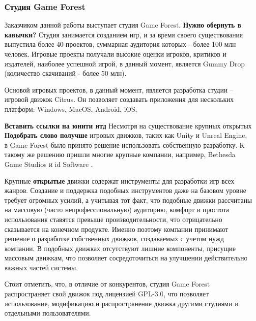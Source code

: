 \documentclass{fefu}
\begin{document}
			\subsubsection{Студия Game Forest}
				\par Заказчиком данной работы выступает студия Game Forest. \cite{GFPortal} 
				\textbf{Нужно обернуть в кавычки?} Студия занимается созданием игр, и
				за время своего существования выпустила более 40 проектов, суммарная аудитория 
				которых - более 100 млн человек. Игровые проекты получали высокие оценки
				игроков, критиков и издателей, наиболее успешной игрой, в данный момент,
				является Gummy Drop (количество скачиваний - более 50 млн). 
				\cite{GummyDropPage}
				\par Основой игровых проектов, в данный момент, является разработка студии -- 
				игровой движок Citrus. Он позволяет создавать приложения для нескольких
				платформ: Windows, MacOS, Android, iOS.
				\par \textbf{Вставить ссылки на юнити итд} Несмотря на существование крупных открытых \textbf{Подобрать
				слово получше} игровых движков, таких как Unity и Unreal Engine, в Game Forest
				было принято решение использовать собственную разработку. К такому же решению
				пришли многие крупные компании, например, Bethesda Game Studios 
				\cite{BethesdaEngine} и id Software \cite{idSoftwareEngine}.
				\par Крупные \textbf{открытые} движки содержат инструменты для разработки игр
				всех жанров. Создание и поддержка подобных инструментов даже на базовом уровне
				требует огромных усилий, а учитывая тот факт, что подобные движки рассчитаны
				на массовую (часто непрофессиональную) аудиторию, комфорт и простота
				использования ставятся превыше производительности, что отрицательно сказывается
				на конечном продукте. Именно поэтому компании принимают решение о разработке
				собственных движков, создаваемых с учетом нужд компании. В подобных движках
				отсутствуют лишние компоненты, присущие массовым движкам, что позволяет
				сосредоточиться на улучшении действительно важных частей системы.
				\par Стоит отметить, что, в отличие от конкурентов, студия Game
				Forest распространяет свой движок под лицензией GPL-3.0, что позволяет
				использование, модификацию и распространение движка другими студиями и
				отдельными пользователями.
\end{document}
